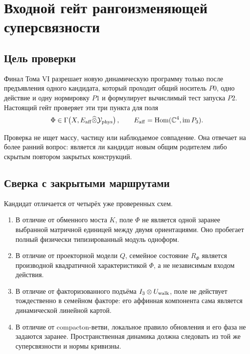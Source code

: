 \chapter{Входной гейт рангоизменяющей суперсвязности}

\section{Цель проверки}

Финал Тома VI разрешает новую динамическую программу только после
предъявления одного кандидата, который проходит общий носитель $P0$, одно
действие и одну нормировку $P1$ и формулирует вычислимый тест запуска $P2$.
Настоящий гейт проверяет эти три пункта для поля
\begin{equation}
 \Phi\in\Gamma\!\left(
 X,
 E_{\rm aff}\widehat\otimes\mathcal Y_{\rm phys}
 \right),
 \qquad
 E_{\rm aff}=\operatorname{Hom}(\mathbb C^4,\operatorname{im}P_3).
\end{equation}

Проверка не ищет массу, частицу или наблюдаемое совпадение. Она отвечает на
более ранний вопрос: является ли кандидат новым общим родителем либо скрытым
повтором закрытых конструкций.

\section{Сверка с закрытыми маршрутами}

Кандидат отличается от четырёх уже проверенных схем.
\begin{enumerate}
 \item В отличие от обменного моста $K$, поле $\Phi$ не является одной
 заранее выбранной матричной единицей между двумя ориентациями. Оно пробегает
 полный физически типизированный модуль одноформ.
 \item В отличие от проекторной модели $Q$, семейное состояние
 $R_\Phi$ является производной квадратичной характеристикой $\Phi$, а не
 независимым входом действия.
 \item В отличие от факторизованного подъёма
 $I_3\otimes U_{\rm walk}$, поле не действует тождественно в семейном
 факторе: его аффинная компонента сама является динамической линейной картой.
 \item В отличие от compacton-ветви, локальное правило обновления и его фаза
 не задаются заранее. Пространственная динамика должна следовать из той же
 суперсвязности и нормы кривизны.
\end{enumerate}

